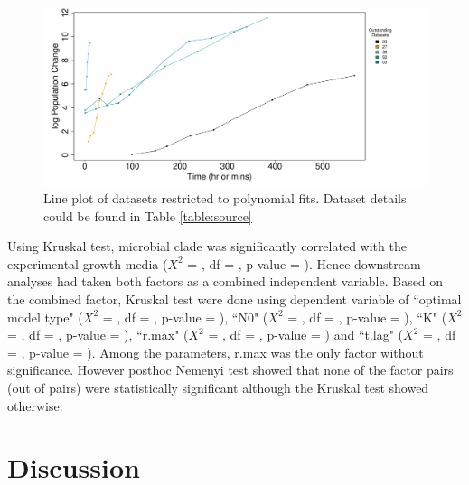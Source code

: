 \documentclass[a4paper, 11pt]{article}
\begin{document}
 \begin{figure}[H]
 	\centering
 	\includegraphics[width=\linewidth]{../results/Log_outstanding.pdf}
 	\caption{Line plot of datasets restricted to polynomial fits. Dataset details could be found in Table \ref{table:source}}\label{lineOut}
 \end{figure}

	Using Kruskal test, microbial clade was significantly correlated with the experimental growth media ($X^{2}$ =
	, df = 
	, p-value = 
	).  Hence downstream analyses had taken both factors as a combined independent variable.  Based on the combined factor, Kruskal test were done using dependent variable of ``optimal model type" ($X^{2}$ =
	, df = 
	, p-value = 
	), ``N0" ($X^{2}$ =
	, df = 
	, p-value = 
	), ``K" ($X^{2}$ =
	, df = 
	, p-value = 
	), ``r.max" ($X^{2}$ =
	, df = 
	, p-value = 
	) and ``t.lag" ($X^{2}$ =
	, df = 
	, p-value = 
	).  Among the parameters, r.max was the only factor without significance.  However posthoc Nemenyi test showed that none of the factor pairs (out of 
	pairs) were statistically significant although the Kruskal test showed otherwise.
	
	\section*{Discussion}
	
\end{document}
